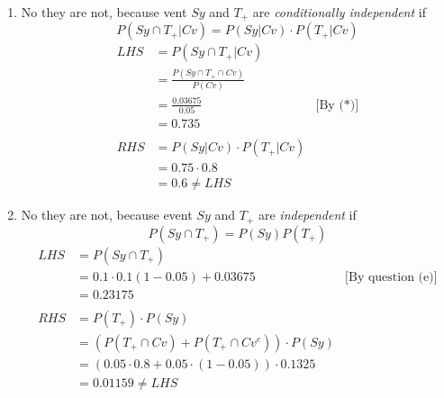 \documentclass[a4paper, 12pt]{article}
\begin{document}
\begin{enumerate}
\begin{enumerate}
\item No they are not, 
	because vent $Sy$ and $T_+$ are \textit{conditionally independent} if 
	$$P(Sy\cap T_+|Cv) = P(Sy|Cv)\cdot P(T_+|Cv)$$
	$$\begin{aligned}
		LHS &= P(Sy\cap T_+|Cv)\\
		&=\frac{P(Sy\cap T_+\cap Cv)}{P(Cv)}\\
		&= \frac{0.03675}{0.05}&\textrm{[By (*)]}\\
		&= 0.735\\\\
		RHS &= P(Sy|Cv)\cdot P(T_+|Cv)\\
			&= 0.75\cdot 0.8\\
			&= 0.6\neq LHS
	\end{aligned}$$
\item 
	No they are not, because event $Sy$ and $T_+$ are \textit{independent} if
	$$P(Sy\cap T_+) = P(Sy)P(T_+)$$
	$$\begin{aligned}
		LHS &= P(Sy\cap T_+)\\
			&= 0.1\cdot 0.1(1-0.05)+0.03675 &\textrm{[By question (e)]}\\
		&= 0.23175\\
		\\
		RHS &= P(T_+)\cdot P(Sy)\\
			&= (P(T_+\cap Cv)+P(T_+\cap Cv^c))\cdot P(Sy)\\
			&= (0.05\cdot 0.8+ 0.05\cdot(1-0.05))\cdot 0.1325\\
			&= 0.01159\neq LHS
	\end{aligned}$$
\end{enumerate}
\end{enumerate}
\end{document}
